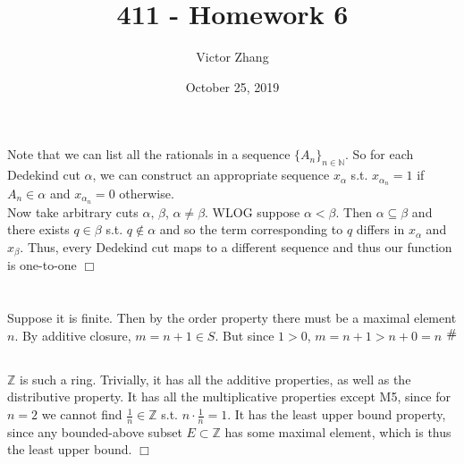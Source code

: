 \documentclass{article}
\title{411 - Homework 6}
\author{Victor Zhang }
\date{October 25, 2019}
\newcommand{\contra}{\raisebox{\depth}{\#}}
\begin{document}
\maketitle

\section{}
Note that we can list all the rationals in a sequence $\{A_n\}_{n \in \mathbb{N}}$. So for each Dedekind cut $\alpha$, we can construct an appropriate sequence $x_\alpha$ s.t. $x_{\alpha_n} = 1$ if $A_n \in \alpha$ and $x_{\alpha_n} = 0$ otherwise.\\
Now take arbitrary cuts $\alpha,\,\beta$, $\alpha \neq \beta$. WLOG suppose $\alpha < \beta$. Then $\alpha \subseteq \beta$ and there exists $q \in \beta$ s.t. $q \notin \alpha$ and so the term corresponding to $q$ differs in $x_\alpha$ and $x_\beta$. Thus, every Dedekind cut maps to a different sequence and thus our function is one-to-one $\Box$

\section{}
\subsection{}
Suppose it is finite. Then by the order property there must be a maximal element $n$. By additive closure, $m = n + 1 \in S$. But since $1 > 0$, $m = n+1 > n+0 = n$ $\contra$

\subsection{}
$\mathbb{Z}$ is such a ring. Trivially, it has all the additive properties, as well as the distributive property. It has all the multiplicative properties except M5, since for $n = 2$ we cannot find $\frac{1}{n} \in \mathbb{Z}$ s.t. $n \cdot \frac{1}{n} = 1$. It has the least upper bound property, since any bounded-above subset $E \subset \mathbb{Z}$ has some maximal element, which is thus the least upper bound. $\Box$

\section{}
\end{document}
